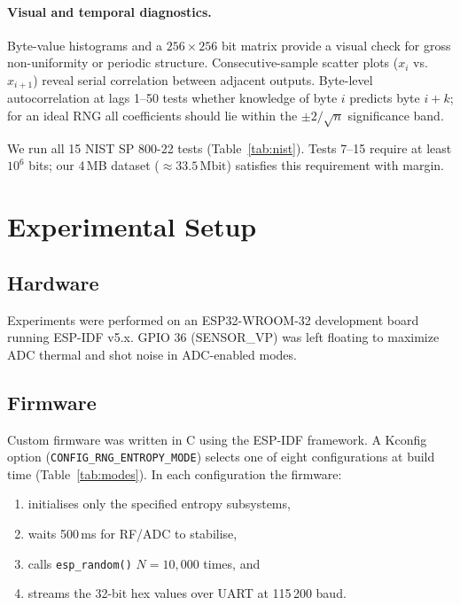\documentclass[10pt,twocolumn]{article}
\begin{document}
\paragraph{Visual and temporal diagnostics.}
Byte-value histograms and a $256\times256$ bit matrix provide a visual
check for gross non-uniformity or periodic structure.
Consecutive-sample scatter plots ($x_i$ vs.\ $x_{i+1}$) reveal serial
correlation between adjacent outputs.
Byte-level autocorrelation at lags 1--50 tests whether knowledge of
byte $i$ predicts byte $i+k$; for an ideal RNG all coefficients should
lie within the $\pm2/\sqrt{n}$ significance band.

We run all 15 NIST SP 800-22 tests (Table~\ref{tab:nist}).
Tests 7--15 require at least $10^6$ bits; our 4\,MB dataset
($\approx33.5\,\text{Mbit}$) satisfies this requirement with margin.

\section{Experimental Setup}

\subsection{Hardware}

Experiments were performed on an ESP32-WROOM-32 development board
running ESP-IDF v5.x.
GPIO 36 (SENSOR\_VP) was left floating to maximize ADC thermal and
shot noise in ADC-enabled modes.

\subsection{Firmware}

Custom firmware was written in C using the ESP-IDF framework.
A Kconfig option (\texttt{CONFIG\_RNG\_ENTROPY\_MODE}) selects one of
eight configurations at build time (Table~\ref{tab:modes}).
In each configuration the firmware:
\begin{enumerate}
  \item initialises only the specified entropy subsystems,
  \item waits 500\,ms for RF/ADC to stabilise,
  \item calls \texttt{esp\_random()} $N = 10{,}000$ times, and
  \item streams the 32-bit hex values over UART at 115\,200 baud.
\end{enumerate}
\end{document}
